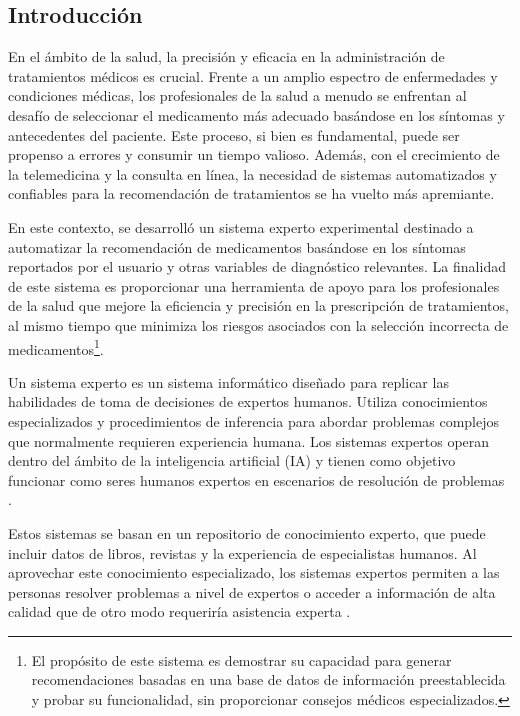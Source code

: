 \documentclass[11pt]{article}
\begin{document}
\begin{multicols}{2}
\section{Introducción}
En el ámbito de la salud, la precisión y eficacia en la administración de tratamientos médicos es crucial. Frente a un amplio espectro de enfermedades y condiciones médicas, los profesionales de la salud a menudo se enfrentan al desafío de seleccionar el medicamento más adecuado basándose en los síntomas y antecedentes del paciente. Este proceso, si bien es fundamental, puede ser propenso a errores y consumir un tiempo valioso. Además, con el crecimiento de la telemedicina y la consulta en línea, la necesidad de sistemas automatizados y confiables para la recomendación de tratamientos se ha vuelto más apremiante.

En este contexto, se desarrolló un sistema experto experimental destinado a automatizar la recomendación de medicamentos basándose en los síntomas reportados por el usuario y otras variables de diagnóstico relevantes. La finalidad de este sistema es proporcionar una herramienta de apoyo para los profesionales de la salud que mejore la eficiencia y precisión en la prescripción de tratamientos, al mismo tiempo que minimiza los riesgos asociados con la selección incorrecta de medicamentos\footnote{El propósito de este sistema es demostrar su capacidad para generar recomendaciones basadas en una base de datos de información preestablecida y probar su funcionalidad, sin proporcionar consejos médicos especializados.}.

Un sistema experto es un sistema informático diseñado para replicar las habilidades de toma de decisiones de expertos humanos. Utiliza conocimientos especializados y procedimientos de inferencia para abordar problemas complejos que normalmente requieren experiencia humana. Los sistemas expertos operan dentro del ámbito de la inteligencia artificial (IA) y tienen como objetivo funcionar como seres humanos expertos en escenarios de resolución de problemas \citep{suryadi, lestari}. 

Estos sistemas se basan en un repositorio de conocimiento experto, que puede incluir datos de libros, revistas y la experiencia de especialistas humanos. Al aprovechar este conocimiento especializado, los sistemas expertos permiten a las personas resolver problemas a nivel de expertos o acceder a información de alta calidad que de otro modo requeriría asistencia experta \citep{suryadi, lestari}.


\end{multicols}
\end{document}
